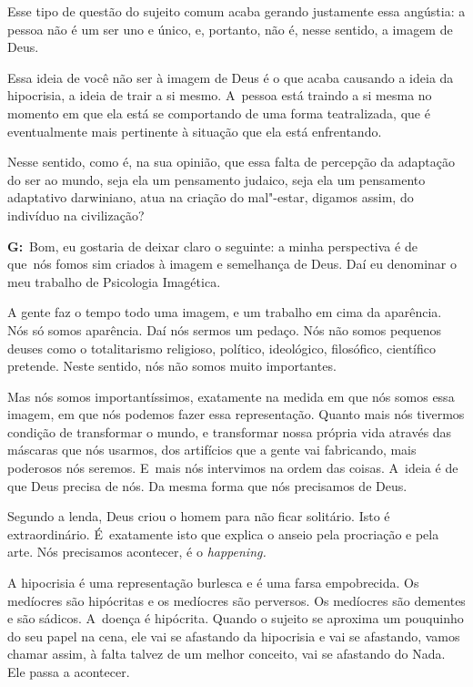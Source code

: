  

Esse tipo de questão do sujeito comum acaba gerando justamente essa
angústia: a pessoa não é um ser uno e único, e, portanto, não é, nesse
sentido, a imagem de Deus.

 

Essa ideia de você não ser à imagem de Deus é o que acaba causando a
ideia da hipocrisia, a ideia de trair a si mesmo. A~pessoa está traindo
a si mesma no momento em que ela está se comportando de uma forma
teatralizada, que é eventualmente mais pertinente à situação que ela
está enfrentando.

 

Nesse sentido, como é, na sua opinião, que essa falta de percepção da
adaptação do ser ao mundo, seja ela um pensamento judaico, seja ela um
pensamento adaptativo darwiniano, atua na criação do mal"-estar, digamos
assim, do indivíduo na civilização?

 

\textbf{G:}~Bom, eu gostaria de deixar claro o seguinte: a minha
perspectiva é de que\textbf{}~nós fomos sim criados à imagem e
semelhança de Deus. Daí eu denominar o meu trabalho de Psicologia
Imagética.

 

A gente faz o tempo todo uma imagem, e um trabalho em cima da aparência.
Nós só somos aparência. Daí nós sermos um pedaço. Nós não somos pequenos
deuses como o totalitarismo religioso, político, ideológico, filosófico,
científico pretende. Neste sentido, nós não somos muito importantes.

 

Mas nós somos importantíssimos, exatamente na medida em que nós somos
essa imagem, em que nós podemos fazer essa representação. Quanto mais
nós tivermos condição de transformar o mundo, e transformar nossa
própria vida através das máscaras que nós usarmos, dos artifícios que a
gente vai fabricando, mais poderosos nós seremos. E~mais nós intervimos
na ordem das coisas. A~ideia é de que Deus precisa de nós. Da mesma
forma que nós precisamos de Deus.

 

Segundo a lenda, Deus criou o homem para não ficar solitário. Isto é
extraordinário. É~exatamente isto que explica o anseio pela procriação e
pela arte. Nós precisamos acontecer, é o \emph{happening.}

 

A hipocrisia é uma representação burlesca e é uma farsa empobrecida. Os
medíocres são hipócritas e os medíocres são perversos. Os medíocres são
dementes e são sádicos. A~doença é hipócrita. Quando o sujeito se
aproxima um pouquinho do seu papel na cena, ele vai se afastando da
hipocrisia e vai se afastando, vamos chamar assim, à falta talvez de um
melhor conceito, vai se afastando do Nada. Ele passa a acontecer.

